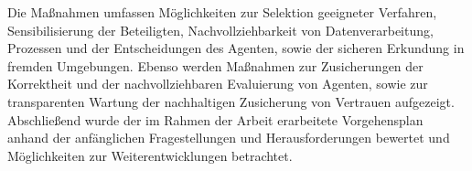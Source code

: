 Die Maßnahmen umfassen Möglichkeiten zur Selektion geeigneter Verfahren, Sensibilisierung der Beteiligten, Nachvollziehbarkeit von Datenverarbeitung, Prozessen und der Entscheidungen des Agenten, sowie der sicheren Erkundung in fremden Umgebungen.
Ebenso werden Maßnahmen zur Zusicherungen der Korrektheit und der nachvollziehbaren Evaluierung von Agenten, sowie zur transparenten Wartung der nachhaltigen Zusicherung von Vertrauen aufgezeigt.
Abschließend wurde der im Rahmen der Arbeit erarbeitete Vorgehensplan anhand der anfänglichen Fragestellungen und Herausforderungen bewertet und Möglichkeiten zur Weiterentwicklungen betrachtet.

